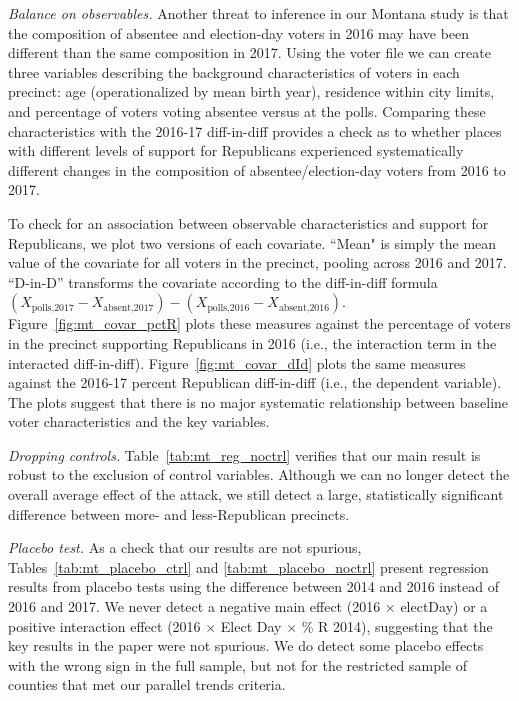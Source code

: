\documentclass[12pt]{article}
\begin{document}
\vspace{4mm}

\textit{Balance on observables.} Another threat to inference in our Montana study is that the composition of absentee and election-day voters in 2016 may have been different than the same composition in 2017. Using the voter file we can create three variables describing the background characteristics of voters in each precinct: age (operationalized by mean birth year), residence within city limits, and percentage of voters voting absentee versus at the polls. Comparing these characteristics with the 2016-17 diff-in-diff provides a check as to whether places with different levels of support for Republicans experienced systematically different changes in the composition of absentee/election-day voters from 2016 to 2017.

To check for an association between observable characteristics and support for Republicans, we plot two versions of each covariate. ``Mean" is simply the mean value of the covariate for all voters in the precinct, pooling across 2016 and 2017. ``D-in-D'' transforms the covariate according to the diff-in-diff formula $(X_{\text{polls,2017}} - X_{\text{absent,2017}}) - (X_{\text{polls,2016}} - X_{\text{absent,2016}})$. Figure~\ref{fig:mt_covar_pctR} plots these measures against the percentage of voters in the precinct supporting Republicans in 2016 (i.e., the interaction term in the interacted diff-in-diff). Figure~\ref{fig:mt_covar_dId} plots the same measures against the 2016-17 percent Republican diff-in-diff (i.e., the dependent variable). The plots suggest that there is no major systematic relationship between baseline voter characteristics and the key variables.

\vspace{4mm}

\textit{Dropping controls.} Table~\ref{tab:mt_reg_noctrl} verifies that our main result is robust to the exclusion of control variables. Although we can no longer detect the overall average effect of the attack, we still detect a large, statistically significant difference between more- and less-Republican precincts.

\vspace{4mm}

\textit{Placebo test.} As a check that our results are not spurious, Tables~\ref{tab:mt_placebo_ctrl} and \ref{tab:mt_placebo_noctrl} present regression results from placebo tests using the difference between 2014 and 2016 instead of 2016 and 2017. We never detect a negative main effect (2016 $\times$ electDay) or a positive interaction effect (2016 $\times$ Elect Day $\times$ \% R 2014), suggesting that the key results in the paper were not spurious. We do detect some placebo effects with the wrong sign in the full sample, but not for the restricted sample of counties that met our parallel trends criteria.
\end{document}
